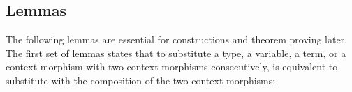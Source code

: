 \documentclass{acm_proc_article-sp}
\begin{document}
{\begin{code}
\>[48]\<%
\\
\>[0]\<[8]%
\>[8]        \<[25]%
\>[25]\<%
\\
\>[0]\<[8]%
\>[8]  \AgdaSymbol{\{\_\}} \AgdaSymbol{\{}  \AgdaSymbol{(} \AgdaInductiveConstructor{,} \AgdaSymbol{)\}} \AgdaSymbol{(} \AgdaInductiveConstructor{,} \AgdaSymbol{)} \AgdaSymbol{(} \AgdaInductiveConstructor{,} \AgdaSymbol{)}\<%
\\
\>  \AgdaSymbol{(} \AgdaSymbol{\_)} \AgdaSymbol{=} \<%
\\
%
\\
\>\<\end{code}
}


\subsection{Lemmas}

The following lemmas are essential for constructions and theorem
proving later.  The first set of lemmas states that to substitute a
type, a variable, a term, or a context morphism with two context
morphisms consecutively, is equivalent to substitute with the
composition of the two context morphisms:
\end{document}
